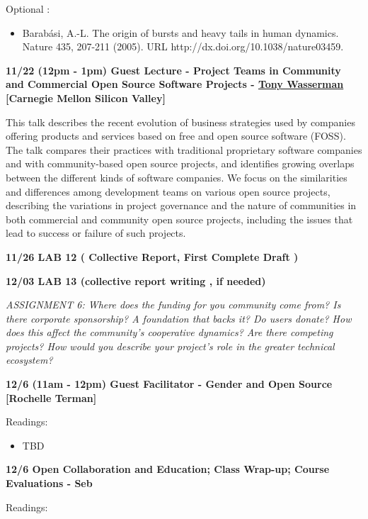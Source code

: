 Optional :

\begin{itemize}
\itemsep1pt\parskip0pt
\item
  Barabási, A.-L. The origin of bursts and heavy tails in human
  dynamics. Nature 435, 207-211 (2005). URL
  http://dx.doi.org/10.1038/nature03459.
\end{itemize}

\textbf{11/22 (12pm - 1pm) Guest Lecture - Project Teams in Community
and Commercial Open Source Software Projects -
\href{http://about.me/tony.wasserman/bio}{Tony Wasserman} {[}Carnegie
Mellon Silicon Valley{]}}

This talk describes the recent evolution of business strategies used by
companies offering products and services based on free and open source
software (FOSS). The talk compares their practices with traditional
proprietary software companies and with community-based open source
projects, and identifies growing overlaps between the different kinds of
software companies. We focus on the similarities and differences among
development teams on various open source projects, describing the
variations in project governance and the nature of communities in both
commercial and community open source projects, including the issues that
lead to success or failure of such projects.

\textbf{11/26 LAB 12 ( Collective Report, First Complete Draft )}

\textbf{12/03 LAB 13 (collective report writing , if needed)}

\emph{ASSIGNMENT 6: Where does the funding for you community come from?
Is there corporate sponsorship? A foundation that backs it? Do users
donate? How does this affect the community's cooperative dynamics? Are
there competing projects? How would you describe your project's role in
the greater technical ecosystem?}

\textbf{12/6 (11am - 12pm) Guest Facilitator - Gender and Open Source
{[}Rochelle Terman{]}}

Readings:

\begin{itemize}
\itemsep1pt\parskip0pt
\item
  TBD
\end{itemize}

\textbf{12/6 Open Collaboration and Education; Class Wrap-up; Course
Evaluations - Seb}

Readings:

